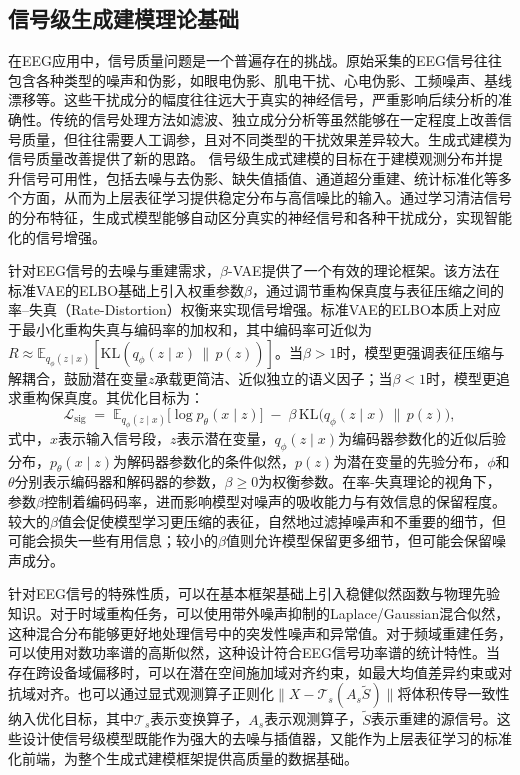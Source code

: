 \subsection{信号级生成建模理论基础}

在EEG应用中，信号质量问题是一个普遍存在的挑战。原始采集的EEG信号往往包含各种类型的噪声和伪影，如眼电伪影、肌电干扰、心电伪影、工频噪声、基线漂移等。这些干扰成分的幅度往往远大于真实的神经信号，严重影响后续分析的准确性。传统的信号处理方法如滤波、独立成分分析等虽然能够在一定程度上改善信号质量，但往往需要人工调参，且对不同类型的干扰效果差异较大。生成式建模为信号质量改善提供了新的思路。
信号级生成式建模的目标在于建模观测分布并提升信号可用性，包括去噪与去伪影、缺失值插值、通道超分重建、统计标准化等多个方面，从而为上层表征学习提供稳定分布与高信噪比的输入。通过学习清洁信号的分布特征，生成式模型能够自动区分真实的神经信号和各种干扰成分，实现智能化的信号增强。

针对EEG信号的去噪与重建需求，$\beta$-VAE提供了一个有效的理论框架\cite{higgins2017beta}。该方法在标准VAE的ELBO基础上引入权重参数$\beta$，通过调节重构保真度与表征压缩之间的率--失真（Rate-Distortion）权衡来实现信号增强。标准VAE的ELBO本质上对应于最小化重构失真与编码率的加权和，其中编码率可近似为$R\!\approx\!\mathbb{E}_{q_{\phi}(z\mid x)}[\mathrm{KL}(q_{\phi}(z\mid x)\,\|\,p(z))]$。当$\beta>1$时，模型更强调表征压缩与解耦合，鼓励潜在变量$z$承载更简洁、近似独立的语义因子；当$\beta<1$时，模型更追求重构保真度。其优化目标为：
\begin{equation}
\label{eq:loss-signal}
\mathcal{L}_{\text{sig}}
\;=\;
\mathbb{E}_{q_{\phi}(z\mid x)} \big[ \log p_{\theta}(x\mid z) \big]
\;-\;
\beta\, \mathrm{KL}\big(q_{\phi}(z\mid x)\,\|\,p(z)\big),
\end{equation}
式中，$x$表示输入信号段，$z$表示潜在变量，$q_{\phi}(z\mid x)$为编码器参数化的近似后验分布，$p_{\theta}(x\mid z)$为解码器参数化的条件似然，$p(z)$为潜在变量的先验分布，$\phi$和$\theta$分别表示编码器和解码器的参数，$\beta \geq 0$为权衡参数。在率-失真理论的视角下，参数$\beta$控制着编码码率，进而影响模型对噪声的吸收能力与有效信息的保留程度。较大的$\beta$值会促使模型学习更压缩的表征，自然地过滤掉噪声和不重要的细节，但可能会损失一些有用信息；较小的$\beta$值则允许模型保留更多细节，但可能会保留噪声成分。

针对EEG信号的特殊性质，可以在基本框架基础上引入稳健似然函数与物理先验知识。对于时域重构任务，可以使用带外噪声抑制的Laplace/Gaussian混合似然，这种混合分布能够更好地处理信号中的突发性噪声和异常值。对于频域重建任务，可以使用对数功率谱的高斯似然，这种设计符合EEG信号功率谱的统计特性。当存在跨设备域偏移时，可以在潜在空间施加域对齐约束，如最大均值差异约束或对抗域对齐。也可以通过显式观测算子正则化$\|X - \mathcal{T}_s(A_s \tilde{S})\|$将体积传导一致性纳入优化目标，其中$\mathcal{T}_s$表示变换算子，$A_s$表示观测算子，$\tilde{S}$表示重建的源信号。这些设计使信号级模型既能作为强大的去噪与插值器，又能作为上层表征学习的标准化前端，为整个生成式建模框架提供高质量的数据基础。


